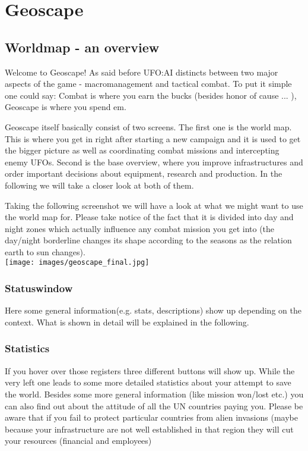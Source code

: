 \section{Geoscape}

\subsection{Worldmap - an overview} 
Welcome to Geoscape! As said before UFO:AI distincts between two major aspects of the game - macromanagement and tactical combat. To put it simple one could say: Combat is where you earn the bucks (besides honor of cause ... ), Geoscape is where you spend em.

Geoscape itself basically consist of two screens. The first one is the world map. This is where you get in right after starting a new campaign and it is used to get the bigger picture as well as coordinating combat missions and intercepting enemy UFOs. Second is the base overview, where you improve infrastructures and order important decisions about equipment, research and production. In the following we will take a closer look at both of them.

Taking the following screenshot we will have a look at what we might want to use the world map for.
Please take notice of the fact that it is divided into day and night zones which actually influence any combat mission you get into (the day/night borderline changes its shape according to the seasons as the relation earth to sun changes).\\

\texttt{[image: images/geoscape\_final.jpg]}

\newpage

\subsubsection{Statuswindow}
Here some general information(e.g. stats, descriptions) show up depending on the context. What is shown in detail will be explained in the following.
\subsubsection{Statistics}
If you hover over those registers three different buttons will show up. While the very left one leads to some more detailed statistics about your attempt to save the world. Besides some more general information (like mission won/lost etc.) you can also find out about the attitude of all the UN countries paying you. Please be aware that if you fail to protect particular countries from alien invasions (maybe because your infrastructure are not well established in that region they will cut your resources (financial and employees)

